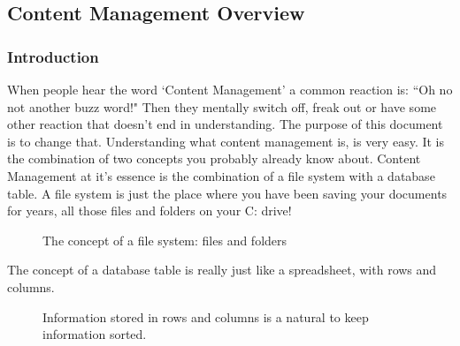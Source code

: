 \subsection{Content Management Overview}

\subsubsection{Introduction}

When people hear the word `Content Management' a common reaction is:
``Oh no not another buzz word!"  Then they mentally switch off, freak
out or have some other reaction that doesn't end in understanding.
The purpose of this document is to change that.  Understanding what
content management is, is very easy.  It is the combination of two
concepts you probably already know about.  Content Management at it's
essence is the combination of a file system with a database table.  A
file system is just the place where you have been saving your
documents for years, all those files and folders on your C: drive!
  
\begin{figure}[h!]
  \centering
  \caption{The concept of a file system: files and folders}
\end{figure}
The concept of a database table is really just like a spreadsheet,
with rows and columns.

\begin{figure}[h!]
  \centering
  \caption{Information stored in rows and columns is a natural to keep information sorted.}
\end{figure}
  
